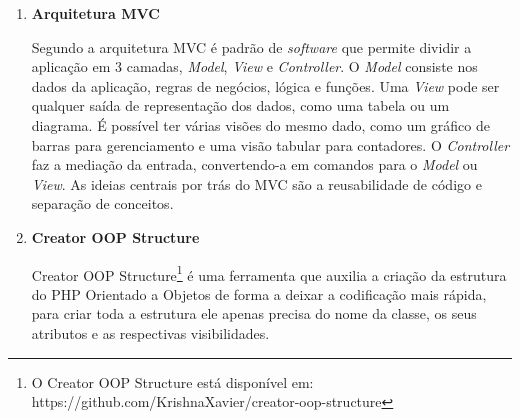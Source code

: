\begin{enumerate}
\item \textbf{Arquitetura MVC}

Segundo  a arquitetura MVC é padrão de \textit{software} que permite dividir a aplicação em 3 camadas, \textit{Model}, \textit{View} e \textit{Controller}. O \textit{Model} consiste nos dados da aplicação, regras de negócios, lógica e funções. Uma \textit{View} pode ser qualquer saída de representação dos dados, como uma tabela ou um diagrama. É possível ter várias visões do mesmo dado, como um gráfico de barras para gerenciamento e uma visão tabular para contadores. O \textit{Controller} faz a mediação da entrada, convertendo-a em comandos para o \textit{Model} ou \textit{View}. As ideias centrais por trás do MVC são a reusabilidade de código e separação de conceitos.

\item \textbf{Creator OOP Structure}

Creator OOP Structure\footnote{O Creator OOP Structure está disponível em: https://github.com/KrishnaXavier/creator-oop-structure}  é uma ferramenta que auxilia a criação da estrutura do PHP Orientado a Objetos de forma a deixar a codificação mais rápida, para criar toda a estrutura ele apenas precisa do nome da classe, os seus atributos e as respectivas visibilidades.



\end{enumerate}



